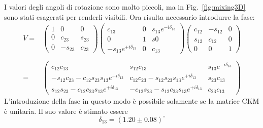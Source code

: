 \documentclass{subnucbo}
\begin{document}
I valori degli angoli di rotazione sono molto piccoli, ma in Fig.~\ref{fig:mixing3D} sono stati esagerati per renderli visibili.
Ora risulta necessario introdurre la fase:
\begin{equation}
        \begin{aligned}
                V= &
                \begin{pmatrix}1 & 0 & 0\\0 & c_{23} & s_{23}\\0 & -s_{23} & c_{23}\end{pmatrix}
                \begin{pmatrix}c_{13} & 0 & s_{13}e^{-i\delta_{13}}\\0 & 1 & s0\\-s_{13}e^{+i\delta_{13}} & 0 & c_{13}\end{pmatrix}
                \begin{pmatrix}c_{12} & -s_{12} & 0\\s_{12} & c_{12} & 0\\0 & 0 & 1\end{pmatrix}\\
                \\
                = &
                \begin{pmatrix}
                c_{12}c_{13} & s_{12}c_{13} & s_{13}e^{-i\delta_{13}}\\
                -s_{12}c_{23}-c_{12}s_{23}s_{13}e^{+i\delta_{13}} & c_{12}c_{23}-s_{12}s_{23}s_{13}e^{+i\delta_{13}} & s_{23}c_{13}\\
                s_{12}s_{23}-c_{12}c_{23}s_{13}e^{+i\delta_{13}} & -c_{12}s_{23}-s_{12}c_{23}s_{13}e^{+i\delta_{13}} & c_{23}c_{13}
                \end{pmatrix}
        \end{aligned}
\end{equation}
L'introduzione della fase in questo modo è possibile solamente se la matrice CKM è unitaria. Il suo valore è stimato essere
\begin{equation}
        \delta_{13}=(1.20\pm0.08)^{\circ}
\end{equation}
\end{document}
